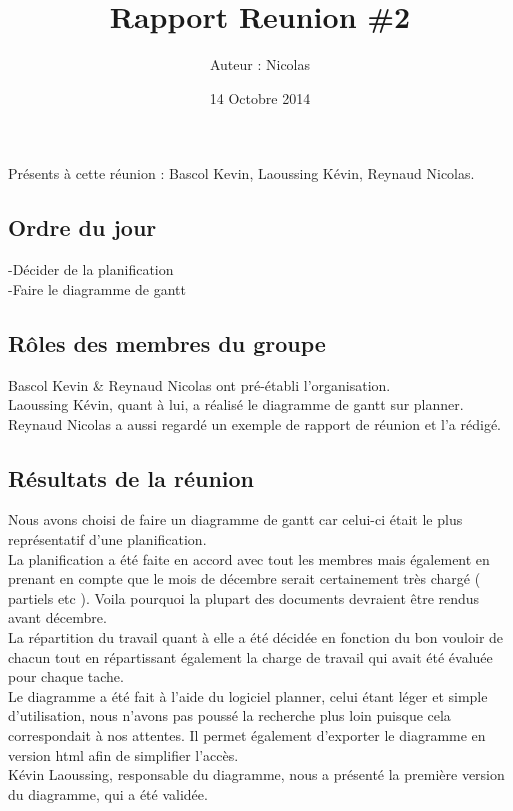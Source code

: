\documentclass{article}
\title{Rapport Reunion \#2}
\author{Auteur : Nicolas \bsc{Reynaud}}
\date{14 Octobre 2014}
\begin{document}
\maketitle
\newpage

Présents à cette réunion : Bascol Kevin, Laoussing Kévin, Reynaud Nicolas.

\subsection*{Ordre du jour}
\indent -Décider de la planification\\
-Faire le diagramme de gantt\\

\subsection*{Rôles des membres du groupe}
Bascol Kevin \& Reynaud Nicolas ont pré-établi l'organisation.\\
\indent Laoussing Kévin, quant à lui, a réalisé le diagramme de gantt sur planner.\\
\indent Reynaud Nicolas a aussi regardé un exemple de rapport de réunion et l'a rédigé.\\

\subsection*{Résultats de la réunion}
Nous avons choisi de faire un diagramme de gantt car celui-ci était le plus représentatif d'une planification.\\

La planification a été faite en accord avec tout les membres mais également en prenant en compte que le mois de décembre serait certainement très chargé ( partiels etc ). Voila pourquoi la plupart des documents devraient être rendus avant décembre.\\

La répartition du travail quant à elle a été décidée en fonction du bon vouloir de chacun tout en répartissant également la charge de travail qui avait été évaluée pour chaque tache.\\

Le diagramme a été fait à l'aide du logiciel planner, celui étant léger et simple d'utilisation, nous n'avons pas poussé la recherche plus loin puisque cela correspondait à nos attentes.
Il permet également d'exporter le diagramme en version html afin de simplifier l'accès.\\
Kévin Laoussing, responsable du diagramme, nous a présenté la première version du diagramme, qui a été validée.\\
\end{document}
